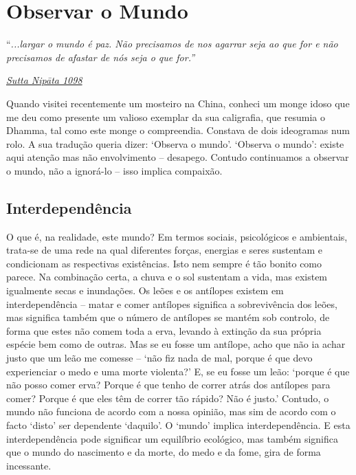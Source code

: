 \chapter{Observar o Mundo}

``\emph{...largar o mundo é paz. Não precisamos de nos agarrar seja ao que for e não precisamos de afastar de nós seja o que for.''}

\href{https://suttacentral.net/snp5.12/en/sujato}{\emph{Sutta Nipāta 1098}}

Quando visitei recentemente um mosteiro na China, conheci um monge idoso que me deu como presente um valioso exemplar da sua caligrafia, que resumia o Dhamma, tal como este monge o compreendia. Constava de dois ideogramas num rolo. A sua tradução queria dizer: `Observa o mundo'. `Observa o mundo': existe aqui atenção mas não envolvimento -- desapego. Contudo continuamos a observar o mundo, não a ignorá-lo -- isso implica compaixão.

\section{Interdependência}

O que é, na realidade, este mundo? Em termos sociais, psicológicos e ambientais, trata-se de uma rede na qual diferentes forças, energias e seres sustentam e condicionam as respectivas existências. Isto nem sempre é tão bonito como parece. Na combinação certa, a chuva e o sol sustentam a vida, mas existem igualmente secas e inundações. Os leões e os antílopes existem em interdependência -- matar e comer antílopes significa a sobrevivência dos leões, mas significa também que o número de antílopes se mantém sob controlo, de forma que estes não comem toda a erva, levando à extinção da sua própria espécie bem como de outras. Mas se eu fosse um antílope, acho que não ia achar justo que um leão me comesse -- `não fiz nada de mal, porque é que devo experienciar o medo e uma morte violenta?' E, se eu fosse um leão: `porque é que não posso comer erva? Porque é que tenho de correr atrás dos antílopes para comer? Porque é que eles têm de correr tão rápido? Não é justo.' Contudo, o mundo não funciona de acordo com a nossa opinião, mas sim de acordo com o facto `disto' ser dependente `daquilo'. O `mundo' implica interdependência. E esta interdependência pode significar um equilíbrio ecológico, mas também significa que o mundo do nascimento e da morte, do medo e da fome, gira de forma incessante.

